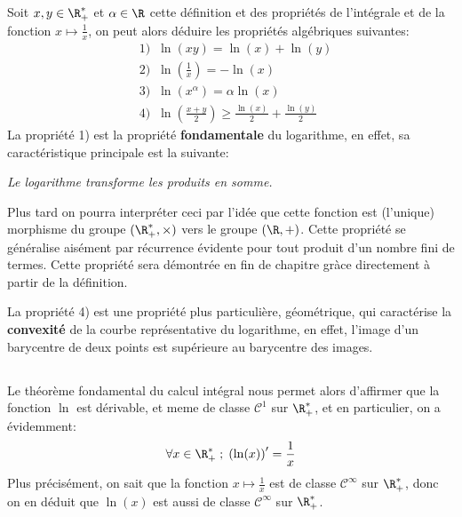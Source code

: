 \documentclass{report}
\begin{document}
   \subsection*{}
   Soit \(x, y \in \R_+^*\) et \(\alpha \in \R\) cette définition et des propriétés de l'intégrale et de la fonction \(x \mapsto \frac{1}{x}\), on peut alors déduire les propriétés algébriques suivantes:
   \begin{align*}
      &1) \;\; \ln(xy) = \ln(x) + \ln(y)\\
      &2) \;\; \ln\left(\frac{1}{x}\right) = -\ln(x)\\
      &3) \;\; \ln(x^\alpha) = \alpha\ln(x)\\
      &4) \;\; \ln\left(\frac{x+y}{2}\right) \geq \frac{\ln(x)}{2} + \frac{\ln(y)}{2}
   \end{align*}
   La propriété 1) est la propriété \textbf{fondamentale} du logarithme, en effet, sa caractéristique principale est la suivante:
   \begin{center}
      \textit{Le logarithme transforme les produits en somme.}
   \end{center}
   Plus tard on pourra interpréter ceci par l'idée que cette fonction est (l'unique) morphisme du groupe \((\R_+^*, \times)\) vers le groupe \((\R, +)\). Cette propriété se généralise aisément par récurrence évidente pour tout produit d'un nombre fini de termes. Cette propriété sera démontrée en fin de chapitre gràce directement à partir de la définition.\<

   La propriété 4) est une propriété plus particulière, géométrique, qui caractérise la \textbf{convexité} de la courbe représentative du logarithme, en effet, l'image d'un barycentre de deux points est supérieure au barycentre des images.
   \pagebreak

   \subsection*{}
   Le théorème fondamental du calcul intégral nous permet alors d'affirmer que la fonction \(\ln\) est dérivable, et meme de classe \(\mathcal{C}^1\) sur \(\R_+^*\), et en particulier, on a évidemment:
   \[
      \forall x \in \R_+^* \; ; \; \left(\ln(x)\right)' = \frac{1}{x}
   \]
   Plus précisément, on sait que la fonction \(x \mapsto \frac{1}{x}\) est de classe \(\mathcal{C}^{\infty}\) sur \(\R_+^*\), donc on en déduit que \(\ln(x)\) est aussi de classe \(\mathcal{C}^{\infty}\) sur \(\R_+^*\).\<
\end{document}
